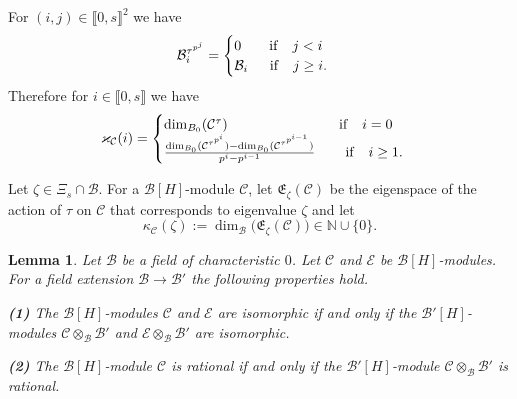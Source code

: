 \documentclass[11pt]{amsart}
\newtheorem{lemma}[theorem]{Lemma}
\begin{document}
For $(i,j)\in\llbracket0,s\rrbracket^2$ we have 
\begin{equation}\label{EQ21}
\mathcal B_i^{\tau^{p^j}}=\begin{cases}0\quad\quad {\rm if}\quad j<i\\
\mathcal B_i\quad\;\; {\rm if}\quad j\ge i.\end{cases}
\end{equation}
Therefore for $i\in\llbracket0,s\rrbracket$ we have
\begin{equation}\label{EQ22}
\varkappa_{\mathcal C}(i)=\begin{cases} \dim_{B_0}(\mathcal C^{\tau})\quad\quad\quad\quad\quad\quad\quad\quad  {\rm if}\quad i=0\\
\frac{\dim_{B_0}(\mathcal C^{\tau^{p^i}})-\dim_{B_0}(\mathcal C^{\tau^{p^{i-1}}})}{p^i-p^{i-1}}\quad\quad\, {\rm if}\quad i\ge 1.\end{cases}
\end{equation}

Let $\zeta\in\Xi_s\cap\mathcal B$. For a $\mathcal B[H]$-module $\mathcal C$, let $\mathfrak E_{\zeta}(\mathcal C)$ be the eigenspace of the action of $\tau$ on $\mathcal C$ that  corresponds to eigenvalue $\zeta$ and let 
$$\kappa_{\mathcal C}(\zeta):=\dim_{\mathcal B}\bigl(\mathfrak E_{\zeta}(\mathcal C)\bigr)\in\mathbb N\cup\{0\}.$$

\begin{lemma}\label{L2} Let $\mathcal B$ be a field of characteristic $0$.  Let $\mathcal C$ and $\mathcal E$ be $\mathcal B[H]$-modules. For a field extension $\mathcal B\rightarrow\mathcal B'$ the following properties hold.

\medskip
{\bf (1)} The $\mathcal B[H]$-modules $\mathcal C$ and $\mathcal E$ are isomorphic if and only if the $\mathcal B'[H]$-modules $\mathcal C\otimes_\mathcal B \mathcal B'$ and $\mathcal E\otimes_\mathcal B \mathcal B'$ are isomorphic.

\smallskip
{\bf (2)} The $\mathcal B[H]$-module $\mathcal C$ is rational if and only if the $\mathcal B'[H]$-module $\mathcal C\otimes_\mathcal B \mathcal B'$ is rational.
\end{lemma}
\end{document}

